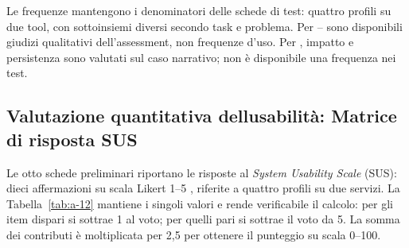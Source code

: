 Le frequenze mantengono i denominatori delle schede di test: quattro
profili su due tool, con sottoinsiemi diversi secondo task e problema.
Per -- sono disponibili giudizi qualitativi dell'assessment,
non frequenze d'uso. Per , impatto e persistenza sono
valutati sul caso narrativo; non è disponibile una frequenza nei test.

\subsection[Risultati SUS]{Valutazione quantitativa dell\textquotesingle usabilità: Matrice di risposta SUS}

Le otto schede preliminari riportano le risposte al \emph{System Usability
Scale} (SUS): dieci affermazioni su scala Likert 1--5
\cite{sauroSUS2011}, riferite a quattro profili su due servizi.
La Tabella~\ref{tab:a-12} mantiene i singoli valori e rende verificabile
il calcolo: per gli item dispari si sottrae 1 al voto; per quelli pari si
sottrae il voto da 5. La somma dei contributi è moltiplicata per 2,5 per
ottenere il punteggio su scala 0--100.

